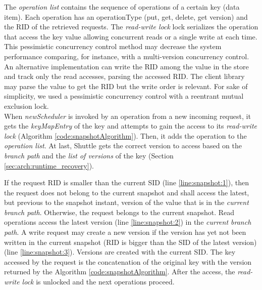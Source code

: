 The \emph{operation list} contains the sequence of operations of a certain key (data item). Each operation has an operationType (put, get, delete, get version) and the \ac{RID} of the retrieved requests. The \emph{read-write lock} lock serializes the operation that access the key value allowing concurrent reads or a single write at each time. This pessimistic concurrency control method may decrease the system performance comparing, for instance, with a multi-version concurrency control. An alternative implementation can write the \ac{RID} among the value in the store and track only the read accesses, parsing the accessed \ac{RID}. The client library may parse the value to get the \ac{RID} but the write order is relevant. For sake of simplicity, we used a pessimistic concurrency control with a reentrant mutual exclusion lock.\\

When \emph{newScheduler} is invoked by an operation from a new incoming request, it gets the \emph{keyMapEntry} of the key and attempts to gain the access to its \emph{read-write lock} (Algorithm \ref{code:snapshotAlgorithm}). Then, it adds the operation to the \emph{operation list}. At last, Shuttle gets the correct version to access based on the \emph{branch path} and the \emph{list of versions} of the key (Section \ref{sec:arch:runtime_recovery}). 

If the request \ac{RID} is smaller than the current \ac{SID} (line \ref{line:snapshot:1}), then the request does not belong to the current snapshot and shall access the latest, but previous to the snapshot instant, version of the value that is in the  \textit{current branch path}. Otherwise, the request belongs to the current snapshot. Read operations access the latest version (line \ref{line:snapshot:2}) in the  \textit{current branch path}. A write request may create a new version if the version has yet not been written in the current snapshot (\ac{RID} is bigger than the \ac{SID} of the latest version) (line \ref{line:snapshot:3}). Versions are created with the current \ac{SID}. The key accessed by the request is the concatenation of the original key with the version returned by the Algorithm \ref{code:snapshotAlgorithm}. After the access, the \emph{read-write lock} is unlocked and the next operations proceed.



